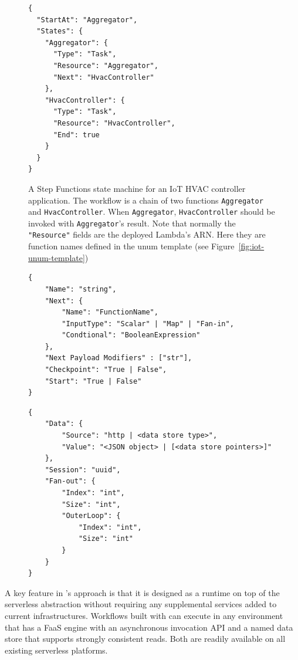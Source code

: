 \begin{figure}[]
    \begin{verbatim}
{
  "StartAt": "Aggregator",
  "States": {
    "Aggregator": {
      "Type": "Task",
      "Resource": "Aggregator",
      "Next": "HvacController"
    },
    "HvacController": {
      "Type": "Task",
      "Resource": "HvacController",
      "End": true
    }
  }
}
    \end{verbatim}
    \caption{A Step Functions state machine for an IoT HVAC controller
    application. The workflow is a chain of two functions \texttt{Aggregator}
    and \texttt{HvacController}. When \texttt{Aggregator},
    \texttt{HvacController} should be invoked with \texttt{Aggregator}'s
    result. Note that normally the \texttt{"Resource"} fields are the deployed
    Lambda's ARN. Here they are function names defined in the unum template
    (see Figure~\ref{fig:iot-unum-template})}
    \label{fig:iot-sf}
\end{figure}

\begin{figure}[]
    \begin{verbatim}
{
    "Name": "string",
    "Next": {
        "Name": "FunctionName",
        "InputType": "Scalar" | "Map" | "Fan-in",
        "Condtional": "BooleanExpression"
    },
    "Next Payload Modifiers" : ["str"],
    "Checkpoint": "True | False",
    "Start": "True | False"
}
    \end{verbatim}
    \caption{}
    \label{fig:unum-config-lang}
\end{figure}

\begin{figure}[]
    \begin{verbatim}
{
    "Data": {
        "Source": "http | <data store type>",
        "Value": "<JSON object> | [<data store pointers>]"
    },
    "Session": "uuid",
	"Fan-out": {
        "Index": "int",
        "Size": "int",
        "OuterLoop": {
            "Index": "int",
            "Size": "int"
        }
    }
}
    \end{verbatim}
    \caption{}
    \label{fig:input-format}
\end{figure}

A key feature in \name{}'s approach is that it is designed as a runtime on top
of the serverless abstraction without requiring any supplemental services
added to current infrastructures. Workflows built with \name{} can execute in
any environment that has a FaaS engine with an asynchronous invocation API and
a named data store that supports strongly consistent reads. Both are readily
available on all existing serverless platforms.


